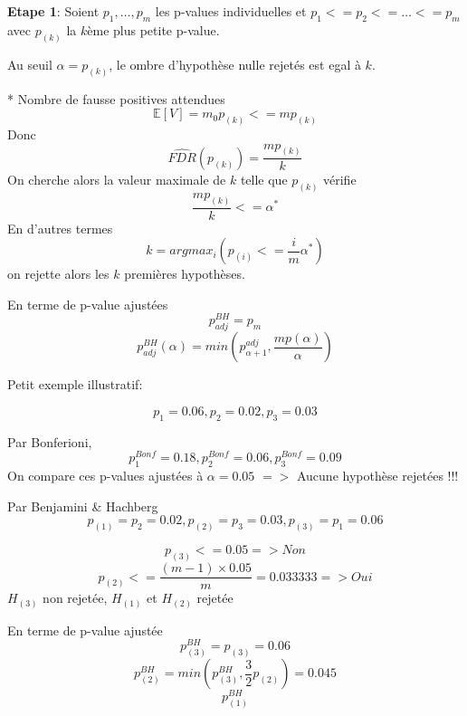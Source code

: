\textbf{Etape 1}: Soient $p_1,\ldots,p_m$ les p-values individuelles et $p_{1}<=p_{2}<=\ldots<=p_{m}$ avec $p_{(k)}$ la $k$\`eme plus petite p-value. 

Au seuil $\alpha=p_{(k)}$, le ombre d'hypoth\`ese nulle rejet\'es est egal \`a $k$.

* Nombre de fausse positives attendues
\begin{equation}
\mathbb{E}[V]=m_0p_{(k)}<=mp_{(k)}
\end{equation} 
Donc 
\begin{equation}
\hat{FDR}(p_{(k)})=\frac{mp_{(k)}}{k}
\end{equation}
On cherche alors la valeur maximale de $k$ telle que $p_{(k)}$ v\'erifie
\begin{equation}
\frac{mp_{(k)}}{k}<=\alpha^*
\end{equation}
En d'autres termes
\begin{equation}
k=argmax_i (p_{(i)}<=\frac{i}{m}\alpha^*)
\end{equation}
on rejette alors les $k$ premi\`eres hypoth\`eses.

En terme de p-value ajust\'ees
\begin{equation}
p_{adj}^{BH}=p_{m}
\end{equation}
\begin{equation}
p_{adj}^{BH}(\alpha)=min(p_{\alpha+1}^{adj},\frac{mp(\alpha)}{\alpha})
\end{equation}

Petit exemple illustratif:

\begin{equation}
p_1=0.06,p_2=0.02,p_3=0.03
\end{equation}

Par Bonferioni,
\begin{equation}
p_1^{Bonf}=0.18,p_2^{Bonf}=0.06, p_3^{Bonf}=0.09
\end{equation}
On compare ces p-values ajust\'ees \`a $\alpha=0.05$
$=>$ Aucune hypoth\`ese rejet\'ees !!!

Par Benjamini & Hachberg
\begin{equation}
p_{(1)}=p_2=0.02, p_{(2)}=p_3=0.03,p_{(3)}=p_1=0.06
\end{equation}

\begin{equation}
p_{(3)}<=0.05 => Non
\end{equation}
\begin{equation}
p_{(2)}<=\frac{(m-1)\times 0.05}{m}=0.033333 => Oui 
\end{equation}
$H_{(3)}$ non rejet\'ee, $H_{(1)}$ et $H_{(2)}$ rejet\'ee

En terme de p-value ajust\'ee
\begin{equation}
p_{(3)}^{BH}=p_{(3)}=0.06
\end{equation}
\begin{equation}
p_{(2)}^{BH}=min(p_{(3)}^{BH},\frac{3}{2}p_{(2)})=0.045
\end{equation}
\begin{equation}
p_{(1)}^{BH}
\end{equation}


